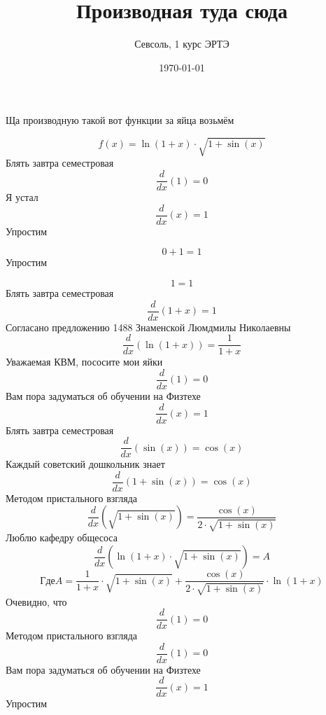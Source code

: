 \documentclass[12pt, a4paper]{article}
\begin{document}
\title{Производная туда сюда
}\author{Севсоль, 1 курс ЭРТЭ}
\date{\today}
\maketitle 
\centerline{Ща производную такой вот функции за яйца возьмём}
\begin{equation}
f(x) = \ln(1+x) \cdot \sqrt{1+\sin(x)}
\end{equation}
Блять завтра семестровая
\begin{equation}
\frac{d}{dx}(1) = 0
\end{equation}
Я устал
\begin{equation}
\frac{d}{dx}(x) = 1
\end{equation}
Упростим

\begin{equation}
0+1 = 1
\end{equation}
Упростим

\begin{equation}
1 = 1
\end{equation}
Блять завтра семестровая
\begin{equation}
\frac{d}{dx}(1+x) = 1
\end{equation}
Согласано предложению 1488 Знаменской Люмдмилы Николаевны
\begin{equation}
\frac{d}{dx}(\ln(1+x)) = \frac{1}{1+x}
\end{equation}
Уважаемая КВМ, пососите мои яйки
\begin{equation}
\frac{d}{dx}(1) = 0
\end{equation}
Вам пора задуматься об обучении на Физтехе
\begin{equation}
\frac{d}{dx}(x) = 1
\end{equation}
Блять завтра семестровая
\begin{equation}
\frac{d}{dx}(\sin(x)) = \cos(x)
\end{equation}
Каждый советский дошкольник знает
\begin{equation}
\frac{d}{dx}(1+\sin(x)) = \cos(x)
\end{equation}
Методом пристального взгляда
\begin{equation}
\frac{d}{dx}(\sqrt{1+\sin(x)}) = \frac{\cos(x)}{2 \cdot \sqrt{1+\sin(x)}}
\end{equation}
Люблю кафедру общесоса
\begin{equation}
\frac{d}{dx}(\ln(1+x) \cdot \sqrt{1+\sin(x)}) = A
\end{equation}
$$Где A = \frac{1}{1+x} \cdot \sqrt{1+\sin(x)}+\frac{\cos(x)}{2 \cdot \sqrt{1+\sin(x)}} \cdot \ln(1+x)$$
Очевидно, что
\begin{equation}
\frac{d}{dx}(1) = 0
\end{equation}
Методом пристального взгляда
\begin{equation}
\frac{d}{dx}(1) = 0
\end{equation}
Вам пора задуматься об обучении на Физтехе
\begin{equation}
\frac{d}{dx}(x) = 1
\end{equation}
Упростим
\end{document}
